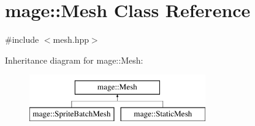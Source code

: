 \hypertarget{classmage_1_1_mesh}{}\section{mage\+:\+:Mesh Class Reference}
\label{classmage_1_1_mesh}


{\ttfamily \#include $<$mesh.\+hpp$>$}

Inheritance diagram for mage\+:\+:Mesh\+:\begin{figure}[H]
\begin{center}
\leavevmode
\includegraphics[height=2.000000cm]{classmage_1_1_mesh}
\end{center}
\end{figure}
